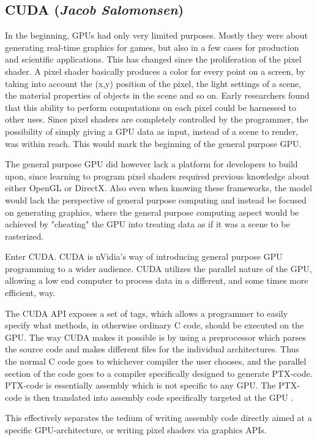 \subsection{CUDA (\textit{Jacob Salomonsen})}
In the beginning, GPUs had only very limited purposes. Mostly they were about generating real-time graphics for games, but also in a few cases for production and scientific applications. This has changed since the proliferation of the pixel shader. A pixel shader basically produces a color for every point on a screen, by taking into account the (x,y) position of the pixel, the light settings of a scene, the material properties of objects in the scene and so on. Early researchers found that this ability to perform computations on each pixel could be harnessed to other uses. Since pixel shaders are completely controlled by the programmer, the possibility of simply giving a GPU data as input, instead of a scene to render, was within reach. This would mark the beginning of the general purpose GPU.

The general purpose GPU did however lack a platform for developers to build upon, since learning to program pixel shaders required previous knowledge about either OpenGL or DirectX. Also even when knowing these frameworks, the model would lack the perspective of general purpose computing and instead be focused on generating graphics, where the general purpose computing aspect would be achieved by "cheating" the GPU into treating data as if it was a scene to be rasterized.

Enter CUDA. CUDA is nVidia's way of introducing general purpose GPU programming to a wider audience. CUDA utilizes the parallel nature of the GPU, allowing a low end computer to process data in a different, and some times more efficient, way.

The CUDA API exposes a set of tags, which allows a programmer to easily specify what methods, in otherwise ordinary C code, should be executed on the GPU. The way CUDA makes it possible is by using a preprocessor which parses the source code and makes different files for the individual architectures. Thus the normal C code goes to whichever compiler the user chooses, and the parallel section of the code goes to a compiler specifically designed to generate PTX-code. PTX-code is essentially assembly which is not specific to any GPU. The PTX-code is then translated into assembly code specifically targeted at the GPU \cite{mpr}.

This effectively separates the tedium of writing assembly code directly aimed at a specific GPU-architecture, or writing pixel shaders via graphics APIs.

